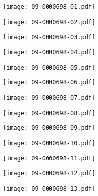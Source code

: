\documentclass[10pt,twocolumn,letterpaper]{article}
\begin{document}
\begin{figure*}[t]
\centering
 \begin{minipage}{0.058\textwidth} \centering \texttt{[image: 09-0000698-01.pdf]} \end{minipage}
 \begin{minipage}{0.058\textwidth} \centering \texttt{[image: 09-0000698-02.pdf]} \end{minipage}
 \begin{minipage}{0.058\textwidth} \centering \texttt{[image: 09-0000698-03.pdf]} \end{minipage}
 \begin{minipage}{0.058\textwidth} \centering \texttt{[image: 09-0000698-04.pdf]} \end{minipage}
 \begin{minipage}{0.058\textwidth} \centering \texttt{[image: 09-0000698-05.pdf]} \end{minipage}
 \begin{minipage}{0.058\textwidth} \centering \texttt{[image: 09-0000698-06.pdf]} \end{minipage}
 \begin{minipage}{0.058\textwidth} \centering \texttt{[image: 09-0000698-07.pdf]} \end{minipage}
 \begin{minipage}{0.058\textwidth} \centering \texttt{[image: 09-0000698-08.pdf]} \end{minipage}
 \begin{minipage}{0.058\textwidth} \centering \texttt{[image: 09-0000698-09.pdf]} \end{minipage}
 \begin{minipage}{0.058\textwidth} \centering \texttt{[image: 09-0000698-10.pdf]} \end{minipage}
 \begin{minipage}{0.058\textwidth} \centering \texttt{[image: 09-0000698-11.pdf]} \end{minipage}
 \begin{minipage}{0.058\textwidth} \centering \texttt{[image: 09-0000698-12.pdf]} \end{minipage}
 \begin{minipage}{0.058\textwidth} \centering \texttt{[image: 09-0000698-13.pdf]} \end{minipage}

\end{figure*}
\end{document}
